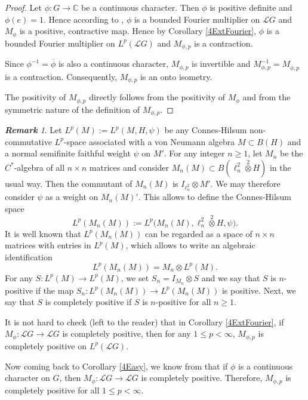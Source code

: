 \documentclass[12pt]{amsart}
\newcommand{\Cdb}{\mbox{$\mathbb{C}$}}
\theoremstyle{remark}
\newtheorem{remark}[theorem]{\bf Remark}
\theoremstyle{definition}
\numberwithin{equation}{section}
\begin{document}
\begin{proof}
Let $\phi\colon G\to \Cdb$ be a continuous character. Then $\phi$
is positive definite and $\phi(e)=1$. Hence according to \cite[Proposition 4.2]{DCH},
$\phi$ is a bounded Fourier multiplier on ${\mathcal L}G$
and $M_\phi$ is a positive, contractive  map.
Hence by Corollary \ref{4ExtFourier}, $\phi$ is a bounded Fourier multiplier on $L^p({\mathcal L}G)$
and $M_{\phi,p}$ is a contraction. 

Since $\phi^{-1}=\overline{\phi}$  is also   a continuous character,
$M_{\phi,p}$ is invertible and $M_{\phi,p}^{-1} = M_{\overline{\phi},p}$ is a contraction. Consequently,
$M_{\phi,p}$ is an onto isometry.

The positivity of $M_{\phi,p}$ directly follows from the positivity of $M_\phi$ 
and from the symmetric nature of the definition of $M_{\phi,p}$.
\end{proof}






\begin{remark}\label{4cp}
Let $L^p(M):=L^p(M,H,\psi)$ be any Connes-Hilsum non-commutative 
$L^p$-space associated with 
a von Neumann algebra $M\subset B(H)$ and a normal semifinite
faithful weight $\psi$ on $M'$. For any integer $n\geq 1$, let 
$M_n$ be the $C^*$-algebra of all $n\times n$ matrices and
consider $M_n(M)\subset B(\ell^2_n\overset{2}{\otimes} H)$ in the usual way. 
Then the commutant of $M_n(M)$ is $I_{\ell^2_n}\otimes M'$.
We may therefore consider $\psi$ as a weight on $M_n(M)'$.
This allows to define the Connes-Hilsum space 
$$
L^p(M_n(M)):=L^p \bigl(M_n(M),\ell^2_n\overset{2}{\otimes} H,\psi\bigr). 
$$
It is well known that $L^p(M_n(M))$ can be regarded as a space of $n\times n$ matrices
with entries in $L^p(M)$, which allows to write an algebraic identification 
$$
L^p(M_n(M)) = M_n\otimes L^p(M).
$$
For any $S\colon  L^p(M)\to  L^p(M)$, we set $S_n=I_{M_n}\otimes S$  and we say
that $S$ is $n$-positive if the map $S_n\colon L^p(M_n(M))\to L^p(M_n(M))$ is positive. Next, we say that
$S$ is completely positive if $S$ is $n$-positive for all $n\geq 1$.

It is not hard to check (left to the reader) that in
Corollary \ref{4ExtFourier}, if $M_\phi\colon {\mathcal L}G\to  {\mathcal L}G$ is completely positive, 
then for any $1\leq p<\infty$, $M_{\phi,p}$ is completely positive on $L^p({\mathcal L}G)$.

Now coming back to Corollary \ref{4Easy}, we know from  \cite[Proposition 4.2]{DCH}
that if $\phi$ is a continuous character on $G$, then $M_\phi\colon {\mathcal L}G\to  {\mathcal L}G$ is completely positive.
Therefore, $M_{\phi,p}$ is completely positive for all $1\leq p<\infty$.
\end{remark}
\end{document}
